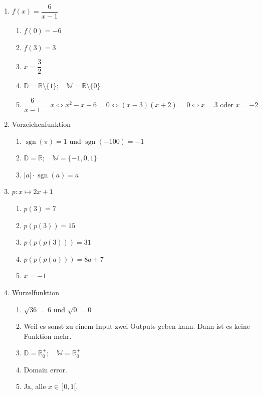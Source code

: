\begin{enumerate}
    \item \(f(x)=\dfrac{6}{x-1}\)
          \begin{enumerate}
              \item \(f(0)=-6\)
              \item \(f(3)=3\)
              \item \(x=\dfrac{3}{2}\)
              \item \(\mathbb{D}=\mathbb{R}\setminus\{1\};
                    \quad \mathbb{W}=\mathbb{R}\setminus\{0\}\)
              \item
                    \[
                        \frac{6}{x-1}=x
                        \iff x^2-x-6=0
                        \iff (x-3)(x+2)=0
                        \iff x=3 \text{ oder } x=-2
                    \]
          \end{enumerate}

    \item Vorzeichenfunktion
          \begin{enumerate}
              \item \(\operatorname{sgn}(\pi)=1\) und
                    \(\operatorname{sgn}(-100)=-1\)
              \item \(\mathbb{D}=\mathbb{R};
                    \quad \mathbb{W}=\{-1,0,1\}\)
              \item \(|a|\cdot\operatorname{sgn}(a)=a\)
          \end{enumerate}

    \item \(p\colon x\mapsto 2x+1\)
          \begin{enumerate}
              \item \(p(3)=7\)
              \item \(p(p(3))=15\)
              \item \(p(p(p(3)))=31\)
              \item \(p(p(p(a)))=8a+7\)
              \item \(x=-1\)
          \end{enumerate}

    \item Wurzelfunktion
          \begin{enumerate}
              \item \(\sqrt{36}=6\) und \(\sqrt{0}=0\)
              \item Weil es sonst zu einem Input zwei Outputs geben
                    kann. Dann ist es keine Funktion mehr.
              \item \(\mathbb{D}=\mathbb{R}_0^+;
                    \quad \mathbb{W}=\mathbb{R}_0^+\)
              \item Domain error.
              \item Ja, alle \(x\in\,]0,1[\).
          \end{enumerate}


\end{enumerate}
